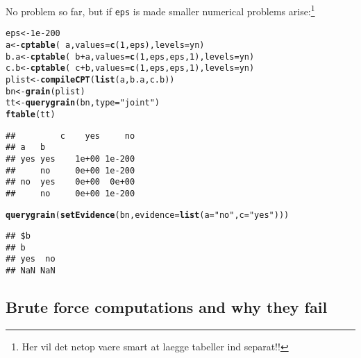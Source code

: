 \documentclass[10pt]{article}\usepackage[]{graphicx}\usepackage[]{color}
\makeatletter
\newcommand{\hlnum}[1]{\textcolor[rgb]{0.686,0.059,0.569}{#1}}%
\newcommand{\hlstr}[1]{\textcolor[rgb]{0.192,0.494,0.8}{#1}}%
\newcommand{\hlopt}[1]{\textcolor[rgb]{0,0,0}{#1}}%
\newcommand{\hlstd}[1]{\textcolor[rgb]{0.345,0.345,0.345}{#1}}%
\newcommand{\hlkwb}[1]{\textcolor[rgb]{0.69,0.353,0.396}{#1}}%
\newcommand{\hlkwc}[1]{\textcolor[rgb]{0.333,0.667,0.333}{#1}}%
\newcommand{\hlkwd}[1]{\textcolor[rgb]{0.737,0.353,0.396}{\textbf{#1}}}%
\newenvironment{kframe}{%
 \def\at@end@of@kframe{}%
 \ifinner\ifhmode%
  \def\at@end@of@kframe{\end{minipage}}%
  \begin{minipage}{\columnwidth}%
 \fi\fi%
 \def\FrameCommand##1{\hskip\@totalleftmargin \hskip-\fboxsep
 \colorbox{shadecolor}{##1}\hskip-\fboxsep
     \hskip-\linewidth \hskip-\@totalleftmargin \hskip\columnwidth}%
 \MakeFramed {\advance\hsize-\width
   \@totalleftmargin\z@ \linewidth\hsize
   \@setminipage}}%
 {\par\unskip\endMakeFramed%
 \at@end@of@kframe}
\newenvironment{knitrout}{}{} %
\def\code#1{{\texttt{#1}}}
\makeatother
\begin{document}
No problem so far, but if \code{eps} is made smaller numerical
problems arise:\footnote{Her vil det netop vaere smart at laegge tabeller ind separat!!}
\begin{knitrout}
\color{fgcolor}\begin{kframe}
\begin{alltt}
\hlstd{eps}  \hlkwb{<-} \hlnum{1e-200}
\hlstd{a}    \hlkwb{<-} \hlkwd{cptable}\hlstd{(}\hlopt{~}\hlstd{a,}   \hlkwc{values}\hlstd{=}\hlkwd{c}\hlstd{(}\hlnum{1}\hlstd{, eps),}\hlkwc{levels}\hlstd{=yn)}
\hlstd{b.a}  \hlkwb{<-} \hlkwd{cptable}\hlstd{(}\hlopt{~}\hlstd{b}\hlopt{+}\hlstd{a,} \hlkwc{values}\hlstd{=}\hlkwd{c}\hlstd{(}\hlnum{1}\hlstd{, eps, eps,} \hlnum{1}\hlstd{),}\hlkwc{levels}\hlstd{=yn)}
\hlstd{c.b}  \hlkwb{<-} \hlkwd{cptable}\hlstd{(}\hlopt{~}\hlstd{c}\hlopt{+}\hlstd{b,} \hlkwc{values}\hlstd{=}\hlkwd{c}\hlstd{(}\hlnum{1}\hlstd{, eps, eps,} \hlnum{1}\hlstd{),}\hlkwc{levels}\hlstd{=yn)}
\hlstd{plist} \hlkwb{<-} \hlkwd{compileCPT}\hlstd{(}\hlkwd{list}\hlstd{(a, b.a, c.b))}
\hlstd{bn}   \hlkwb{<-} \hlkwd{grain}\hlstd{(plist)}
\hlstd{tt}   \hlkwb{<-} \hlkwd{querygrain}\hlstd{(bn,} \hlkwc{type}\hlstd{=}\hlstr{"joint"}\hlstd{)}
\hlkwd{ftable}\hlstd{(tt)}
\end{alltt}
\begin{verbatim}
##         c    yes     no
## a   b                  
## yes yes    1e+00 1e-200
##     no     0e+00 1e-200
## no  yes    0e+00  0e+00
##     no     0e+00 1e-200
\end{verbatim}
\begin{alltt}
\hlkwd{querygrain}\hlstd{(}\hlkwd{setEvidence}\hlstd{(bn,} \hlkwc{evidence}\hlstd{=}\hlkwd{list}\hlstd{(}\hlkwc{a}\hlstd{=}\hlstr{"no"}\hlstd{,} \hlkwc{c}\hlstd{=}\hlstr{"yes"}\hlstd{)))}
\end{alltt}
\begin{verbatim}
## $b
## b
## yes  no 
## NaN NaN
\end{verbatim}
\end{kframe}
\end{knitrout}


\subsection{Brute force computations and why they fail}
\label{sec:brute-force-comp}
\end{document}
